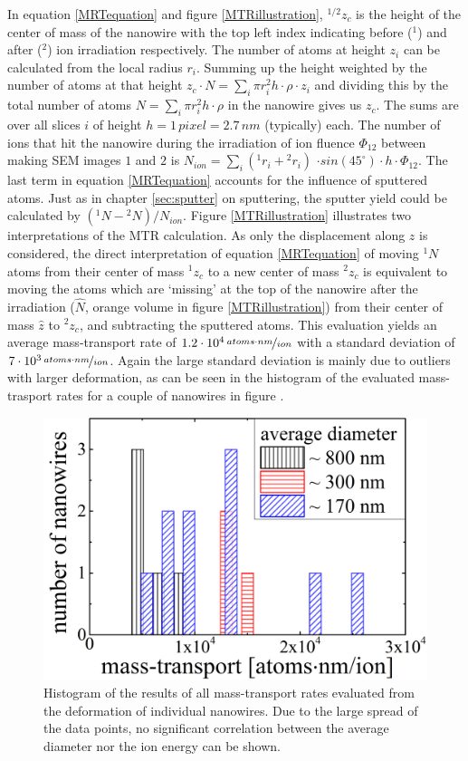 In equation \ref{MRTequation} and figure \ref{MTRillustration}, ${}^{1/2}z_{c}$ is the height of the center of mass of the nanowire with the top left index indicating before ($^1$) and after ($^2$) ion irradiation respectively. The number of atoms at height $z_i$ can be calculated from the local radius $r_i$. Summing up the height weighted by the number of atoms at that height $z_{c} \cdot N = \sum_i{\pi r_i^2 h \cdot \rho \cdot z_i}$ and dividing this by the total number of atoms $N = \sum_i{\pi r_i^2 h \cdot \rho}$ in the nanowire gives us $z_{c}$. The sums are over all slices $i$ of height $h = 1\,pixel = 2.7\,nm$ (typically) each. The number of ions that hit the nanowire during the irradiation of ion fluence $\Phi_{12}$ between making SEM images $1$ and $2$ is $N_{ion} = \sum_i{({}^{1}r_i+{}^{2}r_i)}$ $\cdot sin(45^\circ) \cdot h \cdot \Phi_{12}$. The last term in equation \ref{MRTequation} accounts for the influence of sputtered atoms. Just as in chapter \ref{sec:sputter} on sputtering, the sputter yield could be calculated by $({}^{1}N - {}^{2}N)/N_{ion}$. Figure \ref{MTRillustration} illustrates two interpretations of the MTR calculation. As only the displacement along $z$ is considered, the direct interpretation of equation \ref{MRTequation} of moving ${}^{1}N$ atoms from their center of mass ${}^{1}z_{c}$ to a new center of mass ${}^{2}z_{c}$ is equivalent to moving the atoms which are `missing' at the top of the nanowire after the irradiation ($\hat{N}$, orange volume in figure \ref{MTRillustration}) from their center of mass $\hat{z}$ to ${}^{2}z_{c}$, and subtracting the sputtered atoms. This evaluation yields an average mass-transport rate of $1.2\cdot10^4 \,\nicefrac{atoms \cdot nm}{ion}$ with a standard deviation of $7\cdot 10^3\,\nicefrac{atoms \cdot nm}{ion}$. Again the large standard deviation is mainly due to outliers with larger deformation, as can be seen in the histogram of the evaluated mass-trasport rates for a couple of nanowires in figure \cite{MTReval}.

\begin{figure}
	\centering
		\includegraphics[width=.5\textwidth]{images/MTReval.png}
	\caption{Histogram of the results of all mass-transport rates evaluated from the deformation of individual nanowires. Due to the large spread of the data points, no significant correlation between the average diameter nor the ion energy can be shown.}
	\label{MTReval}
\end{figure}


